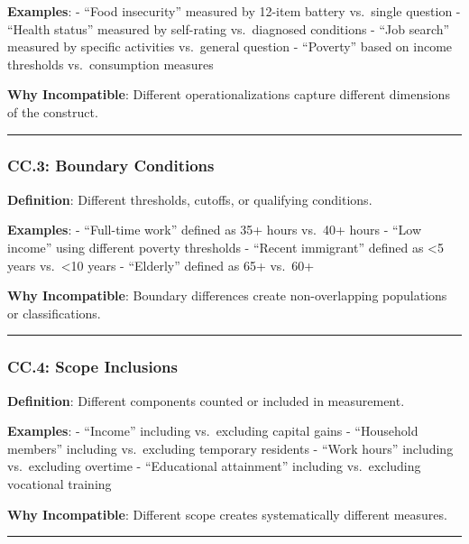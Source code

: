 \documentclass[
  letterpaper,
]{report}
\begin{document}
\textbf{Examples}: - ``Food insecurity'' measured by 12-item battery
vs.~single question - ``Health status'' measured by self-rating
vs.~diagnosed conditions - ``Job search'' measured by specific
activities vs.~general question - ``Poverty'' based on income thresholds
vs.~consumption measures

\textbf{Why Incompatible}: Different operationalizations capture
different dimensions of the construct.

\begin{center}\rule{0.5\linewidth}{0.5pt}\end{center}

\subsubsection{CC.3: Boundary
Conditions}\label{cc.3-boundary-conditions}

\textbf{Definition}: Different thresholds, cutoffs, or qualifying
conditions.

\textbf{Examples}: - ``Full-time work'' defined as 35+ hours vs.~40+
hours - ``Low income'' using different poverty thresholds - ``Recent
immigrant'' defined as \textless5 years vs.~\textless10 years -
``Elderly'' defined as 65+ vs.~60+

\textbf{Why Incompatible}: Boundary differences create non-overlapping
populations or classifications.

\begin{center}\rule{0.5\linewidth}{0.5pt}\end{center}

\subsubsection{CC.4: Scope Inclusions}\label{cc.4-scope-inclusions}

\textbf{Definition}: Different components counted or included in
measurement.

\textbf{Examples}: - ``Income'' including vs.~excluding capital gains -
``Household members'' including vs.~excluding temporary residents -
``Work hours'' including vs.~excluding overtime - ``Educational
attainment'' including vs.~excluding vocational training

\textbf{Why Incompatible}: Different scope creates systematically
different measures.

\begin{center}\rule{0.5\linewidth}{0.5pt}\end{center}
\end{document}
